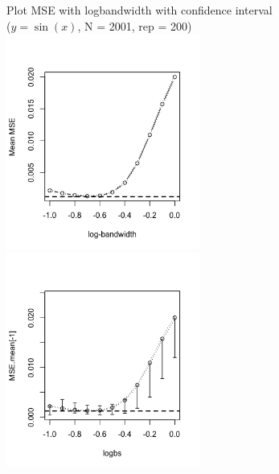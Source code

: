 \documentclass{article}
\begin{document}
\begin{itemize}
\begin{figure}[H]
Plot MSE with logbandwidth with confidence interval \\($y = \sin(x)$, N = 2001, rep = 200)\\
\includegraphics[width=2.5in]{pic/mse.ci0.png}
\includegraphics[width=2.5in]{pic/mse.ci.png}
\end{figure}



\end{itemize}
\end{document}
